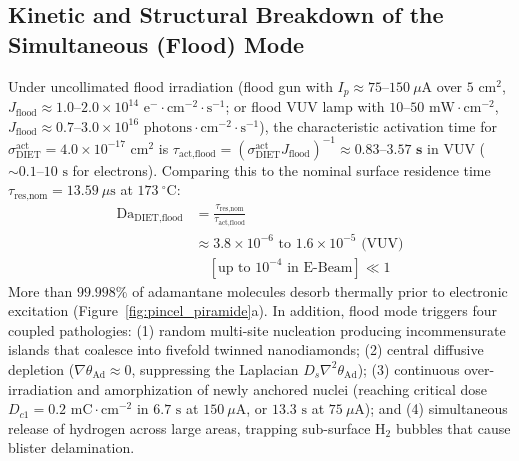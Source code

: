 \documentclass[10pt,twocolumn,a4paper]{article}
\begin{document}
\subsection{Kinetic and Structural Breakdown of the Simultaneous (Flood) Mode}
Under uncollimated flood irradiation (flood gun with $I_p \approx 75\text{--}150\ \mu\text{A}$ over $5\text{ cm}^2$, $J_{\text{flood}} \approx 1.0\text{--}2.0 \times 10^{14}\text{ e}^-\cdot\text{cm}^{-2}\cdot\text{s}^{-1}$; or flood VUV lamp with $10\text{--}50\text{ mW}\cdot\text{cm}^{-2}$, $J_{\text{flood}} \approx 0.7\text{--}3.0 \times 10^{16}\text{ photons}\cdot\text{cm}^{-2}\cdot\text{s}^{-1}$), the characteristic activation time for $\sigma_{\text{DIET}}^{\text{act}} = 4.0 \times 10^{-17}\text{ cm}^2$ is $\tau_{\text{act,flood}} = (\sigma_{\text{DIET}}^{\text{act}} J_{\text{flood}})^{-1} \approx \mathbf{0.83\text{--}3.57\text{ s}}$ in VUV ($\sim 0.1\text{--}10\text{ s}$ for electrons). Comparing this to the nominal surface residence time $\tau_{\text{res,nom}} = 13.59\ \mu\text{s}$ at $173\ ^\circ\text{C}$:
\begin{equation}
\begin{split}
\text{Da}_{\text{DIET,flood}} &= \frac{\tau_{\text{res,nom}}}{\tau_{\text{act,flood}}} \\
&\approx 3.8 \times 10^{-6}\text{ to }1.6 \times 10^{-5}\text{ (VUV)} \\
&\quad \left[\text{up to }10^{-4}\text{ in E-Beam}\right] \ll 1
\end{split}
\end{equation}
More than $\mathbf{99.998\%}$ of adamantane molecules desorb thermally prior to electronic excitation (Figure~\ref{fig:pincel_piramide}a). In addition, flood mode triggers four coupled pathologies: (1) random multi-site nucleation producing incommensurate islands that coalesce into fivefold twinned nanodiamonds; (2) central diffusive depletion ($\nabla\theta_{\text{Ad}} \approx 0$, suppressing the Laplacian $D_s \nabla^2 \theta_{\text{Ad}}$); (3) continuous over-irradiation and amorphization of newly anchored nuclei (reaching critical dose $D_{c1} = 0.2\text{ mC}\cdot\text{cm}^{-2}$ in $6.7\text{ s}$ at $150\ \mu\text{A}$, or $13.3\text{ s}$ at $75\ \mu\text{A}$); and (4) simultaneous release of hydrogen across large areas, trapping sub-surface $\text{H}_2$ bubbles that cause blister delamination.
\end{document}
